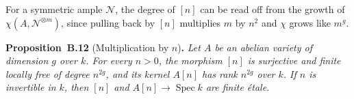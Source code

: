 \documentclass[11pt]{article}
\newenvironment{bpstatement}[2]{\par\addvspace{0.6\baselineskip}\noindent\textbf{#1}#2\textbf{.}\enspace\ignorespaces}
  {\par\addvspace{0.4\baselineskip}}
\newenvironment{bpstatementit}[2]{\begin{bpstatement}{#1}{#2}\itshape\ignorespaces}{\end{bpstatement}}
\begin{document}
\label{bp33}%
For a symmetric ample \(\mathcal N\), the degree of \([n]\) can be read off from the growth of \(\chi(A,\mathcal N^{\otimes m})\), since pulling back by \([n]\) multiplies \(m\) by \(n^2\) and \(\chi\) grows like \(m^g\).

\label{bp34}%
\begin{bpstatementit}{Proposition~B.12}{ (Multiplication by $n$)}
Let \(A\) be an abelian variety of dimension \(g\) over \(k\). For every \(n>0\), the morphism \([n]\) is surjective and finite locally free of degree \(n^{2g}\), and its kernel \(A[n]\) has rank \(n^{2g}\) over \(k\). If \(n\) is invertible in \(k\), then \([n]\) and \(A[n]\to\operatorname{Spec}k\) are finite étale.
\end{bpstatementit}
\end{document}
